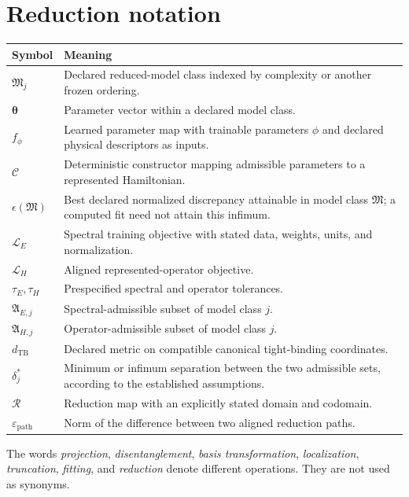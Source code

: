 \section{Reduction notation}

\begin{center}
\small
\begin{tabular}{@{}p{}p{}@{}}
\toprule
Symbol & Meaning \\
\midrule
$\mathfrak M_j$ & Declared reduced-model class indexed by complexity or another
frozen ordering. \\
$\boldsymbol\theta$ & Parameter vector within a declared model class. \\
$f_{\phi}$ & Learned parameter map with trainable parameters $\phi$ and declared
physical descriptors as inputs. \\
$\mathcal C$ & Deterministic constructor mapping admissible parameters to a
represented Hamiltonian. \\
$\epsilon(\mathfrak M)$ & Best declared normalized discrepancy attainable in
model class $\mathfrak M$; a computed fit need not attain this infimum. \\
$\mathcal L_E$ & Spectral training objective with stated data, weights, units,
and normalization. \\
$\mathcal L_H$ & Aligned represented-operator objective. \\
$\tau_E,\tau_H$ & Prespecified spectral and operator tolerances. \\
$\mathfrak A_{E,j}$ & Spectral-admissible subset of model class $j$. \\
$\mathfrak A_{H,j}$ & Operator-admissible subset of model class $j$. \\
$d_{\mathrm{TB}}$ & Declared metric on compatible canonical tight-binding
coordinates. \\
$\delta_j^{\ast}$ & Minimum or infimum separation between the two admissible
sets, according to the established assumptions. \\
$\mathcal R$ & Reduction map with an explicitly stated domain and codomain. \\
$\varepsilon_{\mathrm{path}}$ & Norm of the difference between two aligned
reduction paths. \\
\bottomrule
\end{tabular}
\end{center}

The words \emph{projection}, \emph{disentanglement}, \emph{basis
transformation}, \emph{localization}, \emph{truncation}, \emph{fitting}, and
\emph{reduction} denote different operations. They are not used as synonyms.


